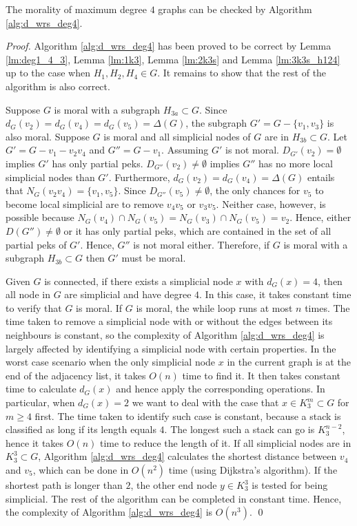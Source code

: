 \begin{theorem}
\label{thm:deg4}
The morality of maximum degree $4$ graphs can be checked by Algorithm \ref{alg:d_wrs_deg4}.
\end{theorem}
\begin{proof}
Algorithm \ref{alg:d_wrs_deg4} has been proved to be correct by Lemma \ref{lm:deg1_4_3}, Lemma \ref{lm:1k3}, Lemma \ref{lm:2k3s} and Lemma \ref{lm:3k3s_h124} up to the case when $H_1,H_2,H_4 \in G$. It remains to show that the rest of the algorithm is also correct.

Suppose $G$ is moral with a subgraph $H_{3a} \subset G$. Since $d_G(v_2)=d_G(v_4)=d_G(v_5)=\Delta(G)$, the subgraph $G'=G-\{v_1,v_3\}$ is also moral. Suppose $G$ is moral and all simplicial nodes of $G$ are in $H_{3b}\subset G$. Let $G'=G-v_1-v_2v_4$ and $G''=G-v_1$. Assuming $G'$ is not moral. $D_{G'}(v_2)=\emptyset$ implies $G'$ has only partial peks. $D_{G''}(v_2)\neq \emptyset$ implies $G''$ has no more local simplicial nodes than $G'$. Furthermore, $d_G(v_2)=d_G(v_4)=\Delta(G)$ entails that $N_G(v_2v_4)=\{v_1,v_5\}$. Since $D_{G''}(v_5)\neq \emptyset$, the only chances for $v_5$ to become local simplicial are to remove $v_4v_5$ or $v_3v_5$. Neither case, however, is possible because $N_G(v_4)\cap N_G(v_5)=N_G(v_3) \cap N_G(v_5) = v_2$. Hence, either $D(G'')\neq \emptyset$ or it has only partial peks, which are contained in the set of all partial peks of $G'$. Hence, $G''$ is not moral either. Therefore, if $G$ is moral with a subgraph $H_{3b}\subset G$ then $G'$ must be moral. 

Given $G$ is connected, if there exists a simplicial node $x$ with $d_G(x)=4$, then all node in $G$ are simplicial and have degree $4$. In this case, it takes constant time to verify that $G$ is moral. If $G$ is moral, the while loop runs at most $n$ times. The time taken to remove a simplicial node with or without the edges between its neighbours is constant, so the complexity of Algorithm 
\ref{alg:d_wrs_deg4} is largely affected by identifying a simplicial node with certain properties. In the worst case scenario when the only simplicial node $x$ in the current graph is at the end of the adjacency list, it takes $O(n)$ time to find it. It then takes constant time to calculate $d_G(x)$ and hence apply the corresponding operations. In particular, when $d_G(x)=2$ we want to deal with the case that $x \in K_3^m \subset G$ for $m \ge 4$ first. The time taken to identify such case is constant, because a stack is classified as long if its length equals $4$. The longest such a stack can go is $K_3^{n-2}$, hence it takes $O(n)$ time to reduce the length of it. If all simplicial nodes are in $K_3^3 \subset G$, Algorithm \ref{alg:d_wrs_deg4} calculates the shortest distance between $v_4$ and $v_5$, which can be done in $O(n^2)$ time (using Dijkstra's algorithm). If the shortest path is longer than $2$, the other end node $y \in K_3^3$ is tested for being simplicial. The rest of the algorithm can be completed in constant time. Hence, the complexity of Algorithm \ref{alg:d_wrs_deg4} is $O(n^3)$. \qed
\end{proof}

